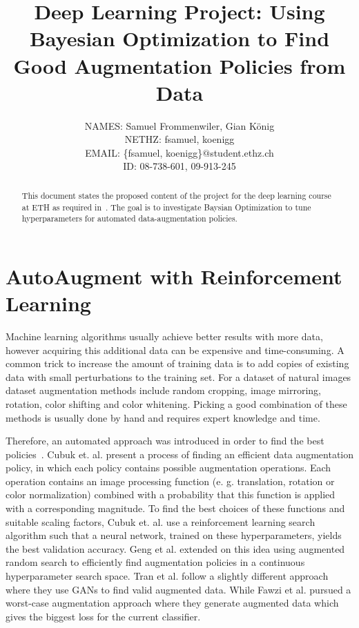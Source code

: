 \documentclass[10pt,twocolumn,letterpaper]{article}
\begin{document}
\title{Deep Learning Project: Using Bayesian Optimization to Find Good Augmentation Policies from Data}

\author{
    	\small{NAMES: Samuel Frommenwiler, Gian K\"onig} \\
   	\small{NETHZ: fsamuel, koenigg}\\
	\small{EMAIL: \{fsamuel, koenigg\}$@$student.ethz.ch}\\
    	\small{ID: 08-738-601, 09-913-245}
}

\maketitle

\begin{abstract}
   This document states the proposed content of the project for the deep learning course at ETH as required in~\cite{DL18}. The goal is to investigate Baysian Optimization to tune hyperparameters for automated data-augmentation policies.
\end{abstract}

\section{AutoAugment with Reinforcement Learning}
Machine learning algorithms usually achieve better results with more data, however acquiring this additional data can be expensive and time-consuming.  A common trick to increase the amount of training data is to add copies of existing data with small perturbations to the training set. For a dataset of natural images dataset augmentation methods include random cropping, image mirroring, rotation, color shifting and color whitening. Picking a good combination of these methods is usually done by hand and requires expert knowledge and time.
\par
  Therefore, an automated approach was introduced in order to find the best policies~\cite{Ekin}. Cubuk et. al. present a process of finding an efficient data augmentation policy, in which each policy contains possible augmentation operations. Each operation contains an image processing function (e. g. translation, rotation or color normalization) combined with a probability that this function is applied with a corresponding magnitude. To find the best choices of these functions and suitable scaling factors, Cubuk et. al. use a reinforcement learning search algorithm such that a neural network, trained on these hyperparameters, yields the best validation accuracy.
  Geng et al. \cite{DBLP:journals/corr/abs-1811-04768} extended on this idea using augmented random search to efficiently find augmentation policies in a continuous hyperparameter search space.
  Tran et al. \cite{DBLP:journals/corr/abs-1710-10564} follow a slightly different approach where they use GANs to find valid augmented data. While Fawzi et al. \cite{Fawzi} pursued a worst-case augmentation approach where they generate augmented data which gives the biggest loss for the current classifier.
\end{document}
